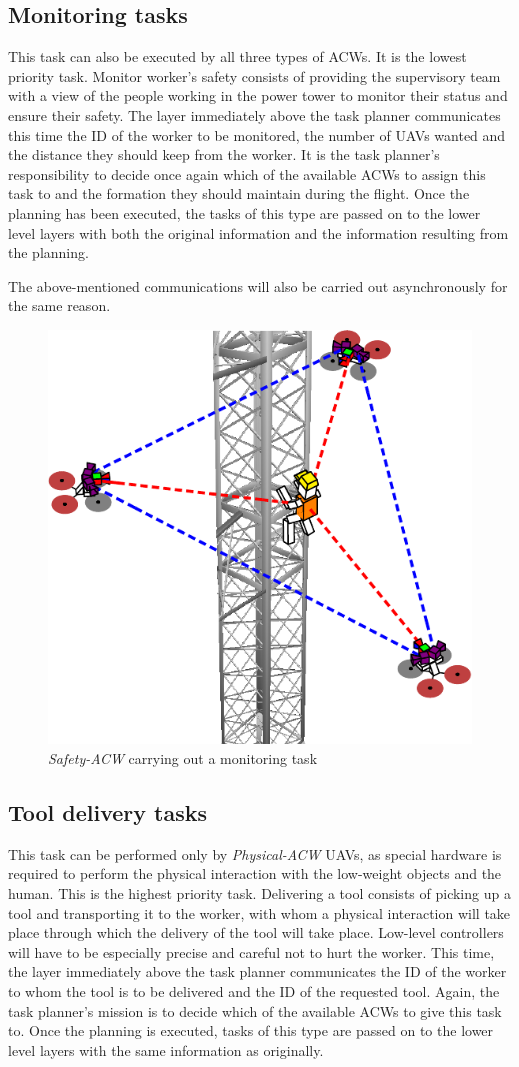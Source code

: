 \subsection{Monitoring tasks}
\label{subsec:MonitoringTasks}
This task can also be executed by all three types of \glspl{ACW}. It is the lowest priority task. Monitor worker's safety consists of providing the supervisory team with a view of the people working in the power tower to monitor their status and ensure their safety. The layer immediately above the task planner communicates this time the \gls{ID} of the worker to be monitored, the number of \glspl{UAV} wanted and the distance they should keep from the worker. It is the task planner's responsibility to decide once again which of the available \glspl{ACW} to assign this task to and the formation they should maintain during the flight. Once the planning has been executed, the tasks of this type are passed on to the lower level layers with both the original information and the information resulting from the planning.

The above-mentioned communications will also be carried out asynchronously for the same reason. 

\begin{figure}[htbp]
    \centering
    \includegraphics[width=0.5\linewidth]
    {ProblemFormulation/figures/monitor_task.pdf}
    \caption{\textit{Safety-ACW} carrying out a monitoring task}
    \label{fig:monitor_task}
\end{figure}

\subsection{Tool delivery tasks}
\label{subsec:ToolDeliveryTasks}
This task can be performed only by \textit{Physical-ACW} \glspl{UAV}, as special hardware is required to perform the physical interaction with the low-weight objects and the human. This is the highest priority task. Delivering a tool consists of picking up a tool and transporting it to the worker, with whom a physical interaction will take place through which the delivery of the tool will take place. Low-level controllers will have to be especially precise and careful not to hurt the worker. This time, the layer immediately above the task planner communicates the \gls{ID} of the worker to whom the tool is to be delivered and the \gls{ID} of the requested tool. Again, the task planner's mission is to decide which of the available \glspl{ACW} to give this task to. Once the planning is executed, tasks of this type are passed on to the lower level layers with the same information as originally.

